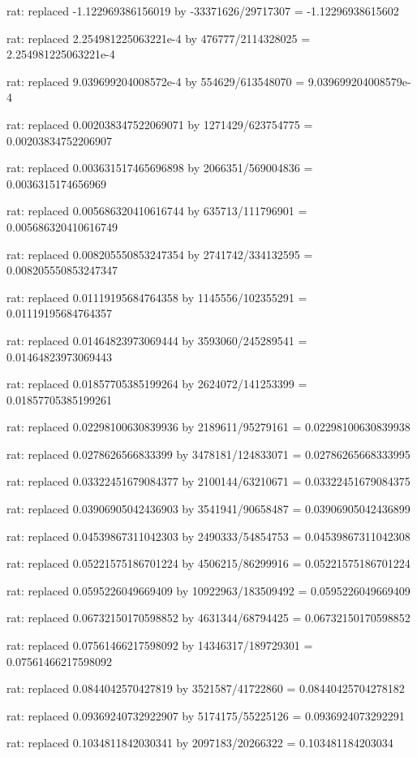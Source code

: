 \documentclass[a4paper,10pt]{article}
\begin{document}
\begin{eulernotebook}
\begin{eulercomment}
\begin{eulercomment}
\begin{eulercomment}
\begin{eulercomment}
\begin{eulercomment}
\begin{eulercomment}
\begin{eulercomment}
\begin{eulercomment}
\begin{eulercomment}
\begin{eulercomment}
\begin{eulercomment}
\begin{eulercomment}
\begin{eulercomment}
\begin{eulercomment}
\begin{eulercomment}
\begin{eulercomment}
\begin{euleroutput}
  rat: replaced -1.122969386156019 by -33371626/29717307 = -1.12296938615602
  
  rat: replaced 2.254981225063221e-4 by 476777/2114328025 = 2.254981225063221e-4
  
  rat: replaced 9.039699204008572e-4 by 554629/613548070 = 9.039699204008579e-4
  
  rat: replaced 0.002038347522069071 by 1271429/623754775 = 0.00203834752206907
  
  rat: replaced 0.003631517465696898 by 2066351/569004836 = 0.0036315174656969
  
  rat: replaced 0.005686320410616744 by 635713/111796901 = 0.005686320410616749
  
  rat: replaced 0.008205550853247354 by 2741742/334132595 = 0.008205550853247347
  
  rat: replaced 0.01119195684764358 by 1145556/102355291 = 0.01119195684764357
  
  rat: replaced 0.01464823973069444 by 3593060/245289541 = 0.01464823973069443
  
  rat: replaced 0.01857705385199264 by 2624072/141253399 = 0.01857705385199261
  
  rat: replaced 0.02298100630839936 by 2189611/95279161 = 0.02298100630839938
  
  rat: replaced 0.0278626566833399 by 3478181/124833071 = 0.02786265668333995
  
  rat: replaced 0.03322451679084377 by 2100144/63210671 = 0.03322451679084375
  
  rat: replaced 0.03906905042436903 by 3541941/90658487 = 0.03906905042436899
  
  rat: replaced 0.04539867311042303 by 2490333/54854753 = 0.04539867311042308
  
  rat: replaced 0.05221575186701224 by 4506215/86299916 = 0.05221575186701224
  
  rat: replaced 0.0595226049669409 by 10922963/183509492 = 0.0595226049669409
  
  rat: replaced 0.06732150170598852 by 4631344/68794425 = 0.06732150170598852
  
  rat: replaced 0.07561466217598092 by 14346317/189729301 = 0.07561466217598092
  
  rat: replaced 0.0844042570427819 by 3521587/41722860 = 0.08440425704278182
  
  rat: replaced 0.09369240732922907 by 5174175/55225126 = 0.0936924073292291
  
  rat: replaced 0.1034811842030341 by 2097183/20266322 = 0.103481184203034
  

\end{euleroutput}
\end{eulercomment}
\end{eulercomment}
\end{eulercomment}
\end{eulercomment}
\end{eulercomment}
\end{eulercomment}
\end{eulercomment}
\end{eulercomment}
\end{eulercomment}
\end{eulercomment}
\end{eulercomment}
\end{eulercomment}
\end{eulercomment}
\end{eulercomment}
\end{eulercomment}
\end{eulercomment}
\end{eulernotebook}
\end{document}
